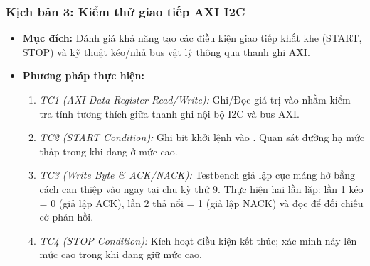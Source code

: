 \subsubsection{Kịch bản 3: Kiểm thử giao tiếp AXI I2C}
\begin{itemize}
    \item \textbf{Mục đích:} Đánh giá khả năng tạo các điều kiện giao tiếp khắt khe (START, STOP) và kỹ thuật kéo/nhả bus vật lý thông qua thanh ghi AXI.
    \item \textbf{Phương pháp thực hiện:}
        \begin{enumerate}
            \item \textit{TC1 (AXI Data Register Read/Write):} Ghi/Đọc giá trị  vào  nhằm kiểm tra tính tương thích giữa thanh ghi nội bộ I2C và bus AXI.
            \item \textit{TC2 (START Condition):} Ghi bit khởi lệnh vào . Quan sát đường  hạ mức thấp trong khi  đang ở mức cao.
            \item \textit{TC3 (Write Byte \& ACK/NACK):} Testbench giả lập cực máng hở bằng cách can thiệp vào  ngay tại chu kỳ thứ 9. Thực hiện hai lần lặp: lần 1 kéo  = 0 (giả lập ACK), lần 2 thả nổi  = 1 (giả lập NACK) và đọc  để đối chiếu cờ phản hồi.
            \item \textit{TC4 (STOP Condition):} Kích hoạt điều kiện kết thúc; xác minh  nảy lên mức cao trong khi  đang giữ mức cao.
        \end{enumerate}
\end{itemize}

